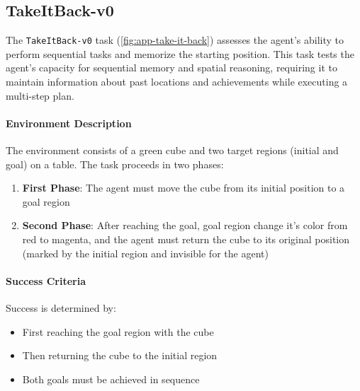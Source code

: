\subsection{TakeItBack-v0}
\label{app:take-it-back}

The \texttt{TakeItBack-v0} task (\autoref{fig:app-take-it-back}) assesses the agent's ability to perform sequential tasks and memorize the starting position. This task tests the agent's capacity for sequential memory and spatial reasoning, requiring it to maintain information about past locations and achievements while executing a multi-step plan.

\paragraph{Environment Description} The environment consists of a green cube and two target regions (initial and goal) on a table. The task proceeds in two phases:
\begin{enumerate}
    \item \textbf{First Phase}: The agent must move the cube from its initial position to a goal region
    \item \textbf{Second Phase}: After reaching the goal, goal region change it's color from red to magenta, and the agent must return the cube to its original position (marked by the initial region and invisible for the agent)
\end{enumerate}

\paragraph{Success Criteria} Success is determined by:
\begin{itemize}
    \item First reaching the goal region with the cube
    \item Then returning the cube to the initial region
    \item Both goals must be achieved in sequence
\end{itemize}

